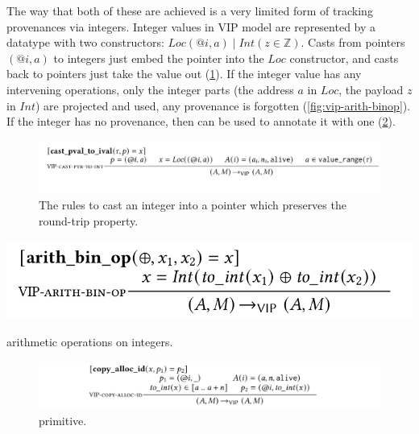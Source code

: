 The way that both of these are achieved is a very limited form of tracking
provenances via integers. Integer values in VIP model are represented by a
datatype with two constructors: $\mathit{Loc(@i, a)} \mid \mathit{Int(z \in
\mathbb{Z})}$. Casts from pointers $(@i, a)$ to integers just embed the pointer
into the $\mathit{Loc}$ constructor, and casts back to pointers just take the
value out (\cref{fig:vip-ival-to-pval}). If the integer value has any
intervening operations, only the integer parts (the address $a$ in
$\mathit{Loc}$, the payload $z$ in $\mathit{Int}$) are projected and used, any
provenance is forgotten (\cref{fig:vip-arith-binop}). If the integer has no
provenance, then  can be used to annotate it with one
(\cref{fig:vip-copy-alloc-id}).

\begin{figure}[tp]
    \includegraphics{figures/mem-model-vip-ival-to-pval}
    \caption{The  rules to cast an integer into a pointer which
    preserves the round-trip property.}\label{fig:vip-ival-to-pval}
\end{figure}

\begin{marginfigure}
    \includegraphics{figures/mem-model-vip-arith-binop}
    \caption{ arithmetic operations on integers.}\label{fig:vip-arith-binop}
\end{marginfigure}

\begin{figure}[tp]
    \includegraphics{figures/mem-model-vip-copy-alloc-id}
    \caption{  primitive.}\label{fig:vip-copy-alloc-id}
\end{figure}

